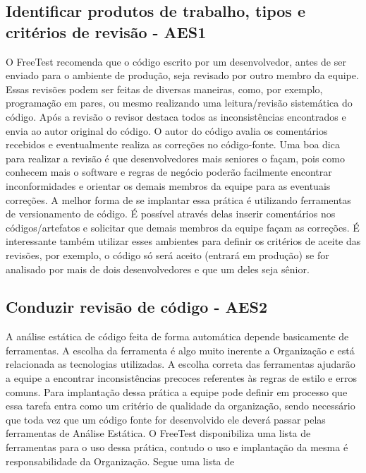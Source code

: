\subsection{Identificar produtos de trabalho, tipos e critérios de revisão - AES1}
\label{sec:guiaaes1}

O FreeTest recomenda que o código escrito por um desenvolvedor, antes de ser enviado para o ambiente de produção, seja revisado por outro membro da equipe. Essas revisões podem ser feitas de diversas maneiras, como, por exemplo, programação em pares, ou mesmo realizando uma leitura/revisão sistemática do código. Após a revisão o revisor destaca todos as inconsistências encontrados e envia ao autor original do código. O autor do código avalia os comentários recebidos e eventualmente realiza as correções no código-fonte.
Uma boa dica para realizar a revisão é que desenvolvedores mais seniores o façam, pois como conhecem mais o software e regras de negócio poderão facilmente encontrar inconformidades e orientar os demais membros da equipe para as eventuais correções.
A melhor forma de se implantar essa prática é utilizando ferramentas de versionamento de código. É possível através delas inserir comentários nos códigos/artefatos e solicitar que demais membros da equipe façam as correções. É interessante também utilizar esses ambientes para definir os critérios de aceite das revisões, por exemplo, o código só será aceito (entrará em produção) se for analisado por mais de dois desenvolvedores e que um deles seja sênior.

\subsection{Conduzir revisão de código - AES2}

A análise estática de código feita de forma automática depende basicamente de ferramentas. A escolha da ferramenta é algo muito inerente a Organização e está relacionada as tecnologias utilizadas. A escolha correta das ferramentas ajudarão a equipe a encontrar inconsistências precoces referentes às regras de estilo e erros comuns.
Para implantação dessa prática a equipe pode definir em processo que essa tarefa entra como um critério de qualidade da organização, sendo necessário que toda vez que um código fonte for desenvolvido ele deverá passar pelas ferramentas de Análise Estática. O FreeTest disponibiliza uma lista de ferramentas para o uso dessa prática, contudo o uso e implantação da mesma é responsabilidade da Organização. Segue uma lista de

